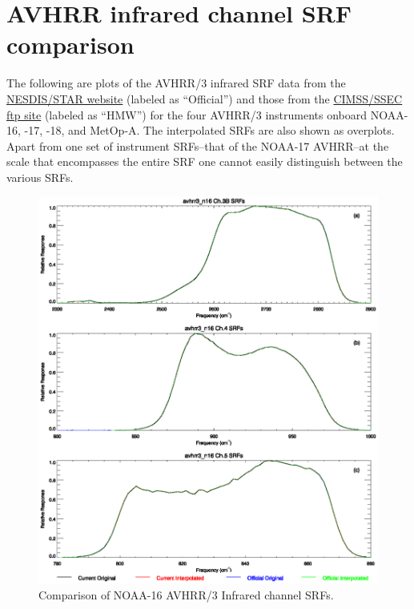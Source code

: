 \section{AVHRR infrared channel SRF comparison}
\label{app:srf}
The following are plots of the AVHRR/3 infrared SRF data from the \href{http://www.star.nesdis.noaa.gov/smcd/spb/fwu/solar_cal/spec_resp_func}{NESDIS/STAR website} (labeled as ``Official'') and those from the \href{ftp://monkey.ssec.wisc.edu/pub/srf}{CIMSS/SSEC ftp site} (labeled as ``HMW'') for the four AVHRR/3 instruments onboard NOAA-16, -17, -18, and MetOp-A. The interpolated SRFs are also shown as overplots. Apart from one set of instrument SRFs--that of the NOAA-17 AVHRR--at the scale that encompasses the entire SRF one cannot easily distinguish between the various SRFs.
\begin{figure}[htp]
  \centering
  \includegraphics[scale=1]{graphics/nominal/avhrr3_n16.srf.eps}
  \caption{Comparison of NOAA-16 AVHRR/3 Infrared channel SRFs.}
  \label{fig:avhrr3_n16}
\end{figure}

